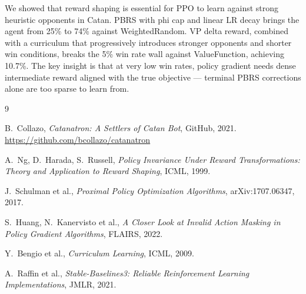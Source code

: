 \documentclass[10pt,twocolumn]{article}
\begin{document}
We showed that reward shaping is essential for PPO to learn against strong
heuristic opponents in Catan. PBRS with phi cap and linear LR decay brings the
agent from 25\% to 74\% against WeightedRandom. VP delta reward, combined with
a curriculum that progressively introduces stronger opponents and shorter win
conditions, breaks the 5\% win rate wall against ValueFunction, achieving 10.7\%.
The key insight is that at very low win rates, policy gradient needs dense
intermediate reward aligned with the true objective --- terminal PBRS corrections
alone are too sparse to learn from.


\begin{thebibliography}{9}

  B.\ Collazo,
  \textit{Catanatron: A Settlers of Catan Bot},
  GitHub, 2021.
  \url{https://github.com/bcollazo/catanatron}

  A.\ Ng, D.\ Harada, S.\ Russell,
  \textit{Policy Invariance Under Reward Transformations: Theory and Application
  to Reward Shaping},
  ICML, 1999.

  J.\ Schulman et al.,
  \textit{Proximal Policy Optimization Algorithms},
  arXiv:1707.06347, 2017.

  S.\ Huang, N.\ Kanervisto et al.,
  \textit{A Closer Look at Invalid Action Masking in Policy Gradient Algorithms},
  FLAIRS, 2022.

  Y.\ Bengio et al.,
  \textit{Curriculum Learning},
  ICML, 2009.

  A.\ Raffin et al.,
  \textit{Stable-Baselines3: Reliable Reinforcement Learning Implementations},
  JMLR, 2021.

\end{thebibliography}
\end{document}
